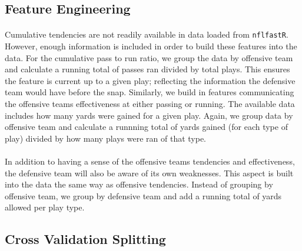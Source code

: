 \documentclass[11pt]{article}
\begin{document}
\begin{multicols*}{2}
        \subsection{Feature Engineering}   
            \paragraph{}
                Cumulative tendencies are not readily available in data loaded from \texttt{nflfastR}. 
                However, enough information is included in order to build these features into the data. 
                For the cumulative pass to run ratio, we group the data by offensive team and calculate a running total of passes ran divided by total plays. 
                This ensures the feature is current up to a given play; reflecting the information the defensive team would have before the snap. 
                Similarly, we build in features communicating the offensive teams effectiveness at either passing or running.
                The available data includes how many yards were gained for a given play. 
                Again, we group data by offensive team and calculate a runnning total of yards gained (for each type of play) divided by how many plays were ran of that type.  
                 
            \vspace{-10pt}

            \paragraph{}
                In addition to having a sense of the offensive teams tendencies and effectiveness, the defensive team will also be aware of its own weaknesses.
                This aspect is built into the data the same way as offensive tendencies. 
                Instead of grouping by offensive team, we group by defensive team and add a running total of yards allowed per play type.
        
        \subsection{Cross Validation Splitting}         

\end{multicols*}
\end{document}
